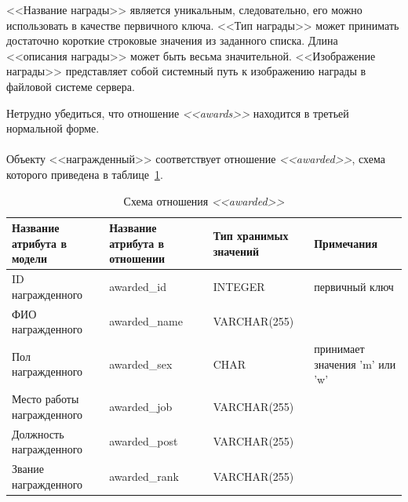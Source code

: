 <<Название награды>> является уникальным, следовательно, его можно использовать
в качестве первичного ключа.
<<Тип награды>> может принимать достаточно короткие строковые значения
из заданного списка.
Длина <<описания награды>> может быть весьма значительной.
<<Изображение награды>> представляет собой системный путь к изображению награды
в файловой системе сервера.

Нетрудно убедиться, что отношение \textit{<<awards>>} находится 
в третьей нормальной форме.

\paragraph{}
Объекту <<награжденный>> соответствует отношение \textit{<<awarded>>},
схема которого приведена в таблице~\ref{tbl:awarded_scheme}.

\begin{table}[h!]


  \caption{Схема отношения \textit{<<awarded>>}}
  \label{tbl:awarded_scheme}
  \small{
    \centering
    \begin{tabular}{| p{} | p{} | p{} | p{} |}
      \hline
      Название атрибута \newline в модели &
      Название атрибута \newline в отношении &
      Тип хранимых \newline значений &
      Примечания \\ \hline

      ID награжденного &
      awarded\_id &
      INTEGER &
      первичный ключ \\
      \hline

      ФИО награжденного &
      awarded\_name &
      VARCHAR(255) & \\
      \hline

      Пол награжденного &
      awarded\_sex &
      CHAR &
      принимает значения 'm' или 'w' \\
      \hline

      Место работы \newline награжденного &
      awarded\_job &
      VARCHAR(255) & \\
      \hline

      Должность \newline награжденного &
      awarded\_post &
      VARCHAR(255) & \\
      \hline

      Звание \newline награжденного &
      awarded\_rank &
      VARCHAR(255) & \\
      \hline

    \end{tabular}
  }
\end{table}

